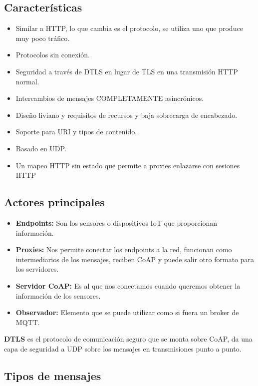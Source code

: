 \documentclass[12pt, twoside, openright]{report} %
\begin{document}
\subsection{Características}
\begin{itemize}
	\item Similar a HTTP, lo que cambia es el protocolo, se utiliza uno que produce muy poco tráfico.
	\item Protocolos sin conexión.
	\item Seguridad a través de DTLS en lugar de TLS en una transmisión HTTP normal.
	\item Intercambios de mensajes COMPLETAMENTE asincrónicos.
	\item Diseño liviano y requisitos de recursos y baja sobrecarga de encabezado.
	\item Soporte para URI y tipos de contenido.
	\item Basado en UDP.
	\item Un mapeo HTTP sin estado que permite a proxies enlazarse con sesiones HTTP
\end{itemize}

\subsection{Actores principales}
\begin{itemize}
	\item \textbf{Endpoints:} Son los sensores o dispositivos IoT que proporcionan información.
	\item \textbf{Proxies:} Nos permite conectar los endpoints a la red, funcionan como intermediarios de los mensajes, reciben CoAP y puede salir otro formato para los servidores.
	\item \textbf{Servidor CoAP:} Es al que nos conectamos cuando queremos obtener la información de los sensores.
	\item \textbf{Observador:} Elemento que se puede utilizar como si fuera un broker de MQTT.

\end{itemize}

\textbf{DTLS} es el protocolo de comunicación seguro que se monta sobre CoAP, da una capa de seguridad a UDP sobre los mensajes en transmisiones punto a punto.

\subsection{Tipos de mensajes}
\end{document}
